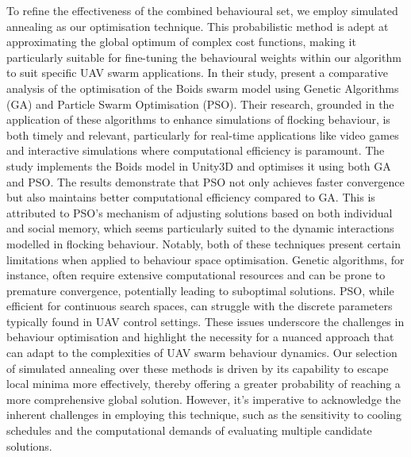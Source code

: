 \documentclass[12pt]{article}
\begin{document}
To refine the effectiveness of the combined behavioural set, we employ simulated annealing as our optimisation technique. This probabilistic method is adept at approximating the global optimum of complex cost functions, making it particularly suitable for fine-tuning the behavioural weights within our algorithm to suit specific UAV swarm applications. In their study, \citet{Alaliyat2014OptimisationOB} present a comparative analysis of the optimisation of the Boids swarm model using Genetic Algorithms (GA) and Particle Swarm Optimisation (PSO). Their research, grounded in the application of these algorithms to enhance simulations of flocking behaviour, is both timely and relevant, particularly for real-time applications like video games and interactive simulations where computational efficiency is paramount. The study implements the Boids model in Unity3D and optimises it using both GA and PSO. The results demonstrate that PSO not only achieves faster convergence but also maintains better computational efficiency compared to GA. This is attributed to PSO's mechanism of adjusting solutions based on both individual and social memory, which seems particularly suited to the dynamic interactions modelled in flocking behaviour. Notably, both of these techniques present certain limitations when applied to behaviour space optimisation. Genetic algorithms, for instance, often require extensive computational resources and can be prone to premature convergence, potentially leading to suboptimal solutions. PSO, while efficient for continuous search spaces, can struggle with the discrete parameters typically found in UAV control settings. These issues underscore the challenges in behaviour optimisation and highlight the necessity for a nuanced approach that can adapt to the complexities of UAV swarm behaviour dynamics. Our selection of simulated annealing over these methods is driven by its capability to escape local minima more effectively, thereby offering a greater probability of reaching a more comprehensive global solution. However, it's imperative to acknowledge the inherent challenges in employing this technique, such as the sensitivity to cooling schedules and the computational demands of evaluating multiple candidate solutions.
\end{document}
